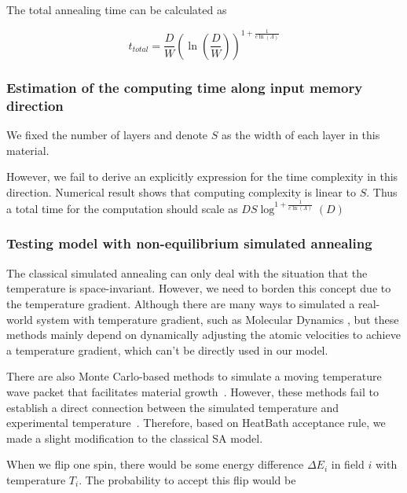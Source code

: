 \documentclass[twocolumn,superscriptaddress,english,showpacs,longbibliography]{revtex4-2}
\begin{document}
The total annealing time can be calculated as 

\begin{equation}
    \label{eq:total-annealing-time}
    t_{total} = \frac{D}{W}(\ln(\frac{D}{W}))^{1+ \frac{1}{c\ln(\Lambda)}}
\end{equation}

\subsubsection{Estimation of the computing time along input memory direction}\label{Estimation-of-the-computing-time-along-input-memory-direction}

We fixed the number of layers and denote $S$ as the width of each layer in this material.

However, we fail to derive an explicitly expression for the time complexity in this direction. 
Numerical result shows that computing complexity is linear to $S$. Thus a total time
for the computation should scale as $DS\log^{1 + \frac{1}{c\ln(\Lambda)}}(D)$ 

\subsubsection{Testing model with non-equilibrium simulated
annealing}\label{some-details-about-non-equilibrium-simulated-annealing}

The classical simulated annealing can only deal with the situation that
the temperature is space-invariant. However, we need to borden this concept
due to the temperature gradient. Although there are many ways to
simulated a real-world system with temperature gradient, such as
Molecular Dynamics \cite{Bai2015, Deng2006}, but
these methods mainly depend on dynamically adjusting the atomic
velocities to achieve a temperature gradient, which can't be directly
used in our model.

There are also Monte Carlo-based methods to simulate a moving
temperature wave packet that facilitates material growth~\cite{Godfrey1995, Tan2017}.
However, these methods fail to establish a direct connection between the simulated temperature and experimental
temperature~\cite{Zollner2014}.
Therefore, based on HeatBath acceptance rule, we made a slight modification to the classical SA model.

When we flip one spin, there would be some energy difference
$\Delta E_{i}$ in field $i$ with temperature $T_i$. The
probability to accept this flip would be
\end{document}
